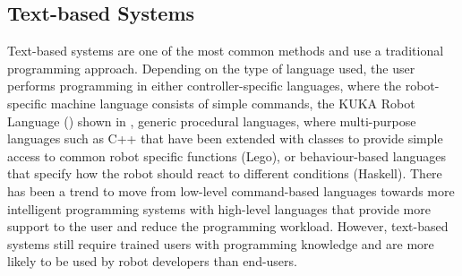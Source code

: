 \subsection{Text-based Systems}\label{sssec:Text-based Systems}
Text-based systems are one of the most common methods and use a traditional programming approach. 
Depending on the type of language used, the user performs programming in either controller-specific languages, where the robot-specific machine language consists of simple commands, \eg the KUKA Robot Language (\cite{braumann2011parametric,muhe2010reverse}) shown in ,
generic procedural languages, where multi-purpose languages such as C++ that have been extended with classes to provide simple access to common robot specific functions ({\eg Lego}), or behaviour-based languages that specify how the robot should react to different conditions (\eg Haskell). 
There has been a trend to move from low-level command-based languages towards more intelligent programming systems with high-level languages that provide more support to the user and reduce the programming workload.
However, text-based systems still require trained users with programming knowledge and are more likely to be used by robot developers than end-users.

